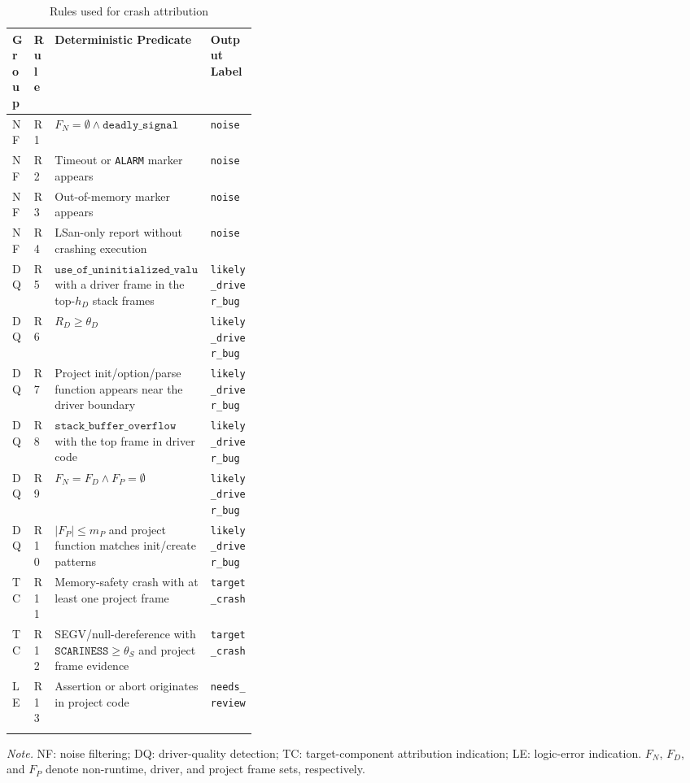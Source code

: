 \documentclass[pdflatex,sn-basic]{sn-jnl}%
\renewcommand{\arraystretch}{1.16}%
\newcommand{\compacttable}{\scriptsize\setlength{\tabcolsep}{2.2pt}\renewcommand{\arraystretch}{1.12}}%
\theoremstyle{thmstyleone}%
\theoremstyle{thmstyletwo}%
\theoremstyle{thmstylethree}%
\begin{document}
\begin{table}[t]
\caption{Rules used for crash attribution}
\label{tab:triage-rule-groups}
\centering
\compacttable
\setlength{\tabcolsep}{2.4pt}
\renewcommand{\arraystretch}{1.10}
\begin{tabularx}{\linewidth}{C{0.08\linewidth} C{0.08\linewidth} Y L{0.19\linewidth}}
\toprule
\textbf{Group} & \textbf{Rule} & \textbf{Deterministic Predicate} & \textbf{Output Label} \\
\midrule
NF & R1 & \(F_N=\emptyset \land \texttt{deadly\_signal}\) & \texttt{noise} \\
NF & R2 & Timeout or \texttt{ALARM} marker appears & \texttt{noise} \\
NF & R3 & Out-of-memory marker appears & \texttt{noise} \\
NF & R4 & LSan-only report without crashing execution & \texttt{noise} \\
\midrule
DQ & R5 & \(\texttt{use\_of\_uninitialized\_value}\) with a driver frame in the top-\(h_D\) stack frames & \texttt{likely\_driver\_bug} \\
DQ & R6 & \(R_D\ge \theta_D\) & \texttt{likely\_driver\_bug} \\
DQ & R7 & Project init/option/parse function appears near the driver boundary & \texttt{likely\_driver\_bug} \\
DQ & R8 & \(\texttt{stack\_buffer\_overflow}\) with the top frame in driver code & \texttt{likely\_driver\_bug} \\
DQ & R9 & \(F_N=F_D \land F_P=\emptyset\) & \texttt{likely\_driver\_bug} \\
DQ & R10 & \(|F_P|\le m_P\) and project function matches init/create patterns & \texttt{likely\_driver\_bug} \\
\midrule
TC & R11 & Memory-safety crash with at least one project frame & \texttt{target\_crash} \\
TC & R12 & SEGV/null-dereference with \(\texttt{SCARINESS}\ge \theta_S\) and project frame evidence & \texttt{target\_crash} \\
\midrule
LE & R13 & Assertion or abort originates in project code & \texttt{needs\_review} \\
\botrule
\end{tabularx}
\vspace{2pt}
{\raggedright\scriptsize \textit{Note.} NF: noise filtering; DQ: driver-quality detection; TC: target-component attribution indication; LE: logic-error indication. \(F_N\), \(F_D\), and \(F_P\) denote non-runtime, driver, and project frame sets, respectively.\par}
\end{table}
\end{document}
